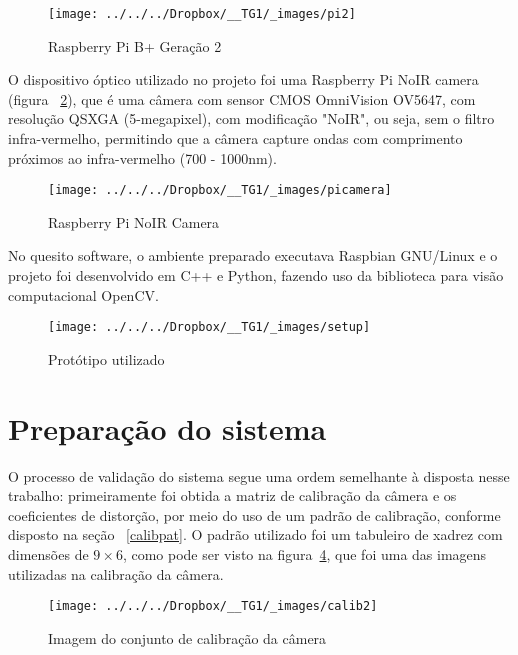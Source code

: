 \documentclass[ecp,tc]{iiufrgs}
\begin{document}
\begin{figure}
	\centering
	\caption{Raspberry Pi B+ Geração 2}
	\texttt{[image: ../../../Dropbox/\_\_TG1/\_images/pi2]}
	\label{fig:rpi}
\end{figure}


O dispositivo óptico utilizado no projeto foi uma Raspberry Pi NoIR camera (figura ~\ref{fig:picam}), que é uma câmera com sensor CMOS OmniVision OV5647, com resolução QSXGA (5-megapixel), com modificação "NoIR", ou seja, sem o filtro infra-vermelho, permitindo que a câmera capture ondas com comprimento próximos ao infra-vermelho (700 - 1000nm).

\begin{figure}
	\centering
	\caption{Raspberry Pi NoIR Camera}
	\texttt{[image: ../../../Dropbox/\_\_TG1/\_images/picamera]}
	\label{fig:picam}
\end{figure}

No quesito software, o ambiente preparado executava Raspbian GNU/Linux e o projeto foi desenvolvido em C++ e Python, fazendo uso da biblioteca para visão computacional OpenCV.

\begin{figure}[h]
	\centering
	\caption{Protótipo utilizado}
	\texttt{[image: ../../../Dropbox/\_\_TG1/\_images/setup]}
	\label{fig:setup}
\end{figure}

\section{Preparação do sistema}

O processo de validação do sistema segue uma ordem semelhante à disposta nesse trabalho: primeiramente foi obtida a matriz de calibração da câmera e os coeficientes de distorção, por meio do uso de um padrão de calibração, conforme disposto na seção ~\ref{calibpat}. O padrão utilizado foi um tabuleiro de xadrez com dimensões de $ 9 \times 6 $, como pode ser visto na figura~\ref{fig:calib2}, que foi uma das imagens utilizadas na calibração da câmera.

\begin{figure}[h]
	\centering
	\caption{Imagem do conjunto de calibração da câmera}
	\texttt{[image: ../../../Dropbox/\_\_TG1/\_images/calib2]}
	\label{fig:calib2}
\end{figure}
\end{document}
